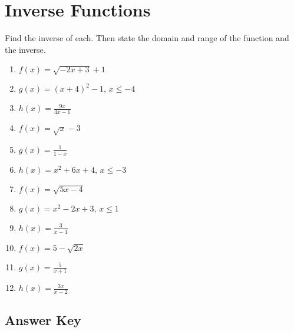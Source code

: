 \chapter{Inverse Functions}

Find the inverse of each. Then state the domain and range of the function and the inverse.

\begin{enumerate}
	\item $f(x) = \sqrt{-2x + 3} + 1$
	\item $g(x) = (x+4)^2 - 1, \, x \leq -4$
	\item $h(x) = \frac{9x}{4x-1}$
	\item $f(x) = \sqrt{x} - 3$
	\item $g(x) = \frac{1}{1-x}$
	\item $h(x) = x^2 + 6x + 4, \, x \leq -3$
	\item $f(x) = \sqrt{5x-4}$
	\item $g(x) = x^2 - 2x + 3, \, x \leq 1$
	\item $h(x) = \frac{3}{x-1}$
	
	\item $f(x) = 5-\sqrt{2x}$
    \item $g(x) = \frac{5}{x+1}$
    \item $h(x) = \frac{3x}{x-2}$
\end{enumerate}

\newpage

\section{Answer Key}

